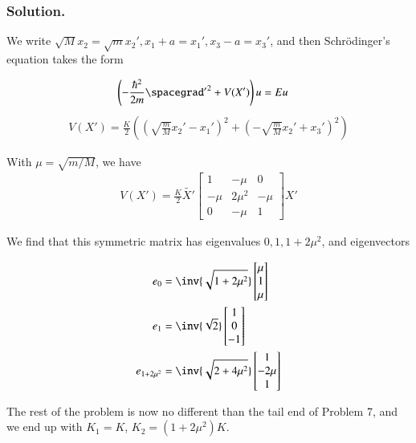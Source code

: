 \subsubsection{Solution.}

We write $\sqrt{M} x_2 = \sqrt{m} x_2', x_1 + a = x_1', x_3 - a = x_3'$, and then  Schr\"{o}dinger's equation takes the form

\begin{align}\label{eqn:desaiCh9:800}
\left( -\frac{\hbar^2}{2m} {\spacegrad'}^2 + V(X') \right) u &= E u 
\end{align}
\begin{align}\label{eqn:desaiCh9:801}
V(X') = \frac{K}{2} 
\left( 
\left( \sqrt{\frac{m}{M}} x_2' - x_1' 
\right)^2
+\left( -\sqrt{\frac{m}{M}} x_2' + x_3' 
\right)^2
\right)
\end{align}

With $\mu = \sqrt{m/M}$, we have
\begin{align}\label{eqn:desaiCh9:802}
V(X') = \frac{K}{2} 
\tilde{X'}
\begin{bmatrix}
1 & -\mu & 0 \\
-\mu & 2 \mu^2 & -\mu \\
0 & -\mu & 1
\end{bmatrix}
X'
\end{align}

We find that this symmetric matrix has eigenvalues $0, 1, 1 + 2 \mu^2$, and eigenvectors

\begin{align}\label{eqn:desaiCh9:803}
e_0 &=
\inv{\sqrt{1 + 2 \mu^2}}
\begin{bmatrix}
\mu \\ 1 \\ \mu
\end{bmatrix} \\
e_1 &=
\inv{\sqrt{2}}
\begin{bmatrix}
1 \\ 0 \\ -1
\end{bmatrix} \\
e_{1+ 2 \mu^2} &=
\inv{\sqrt{2 + 4 \mu^2}}
\begin{bmatrix}
1 \\ -2 \mu \\ 1
\end{bmatrix} 
\end{align}

The rest of the problem is now no different than the tail end of Problem 7, and we end up with $K_1 = K$, $K_2 = (1 + 2 \mu^2) K$.

\EndArticle
